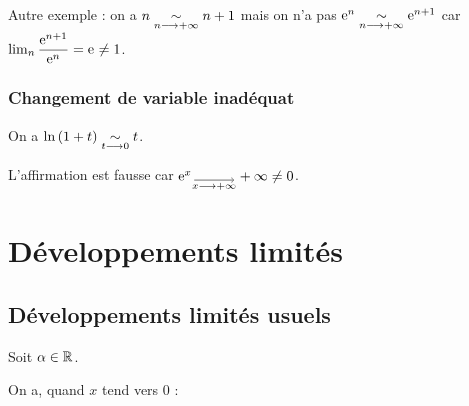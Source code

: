 Autre exemple : on a \(n\underset{n\longrightarrow+\infty}{\sim}n+1\) mais on n'a pas \(\mathrm{e}^{n}\underset{n\longrightarrow+\infty}{\sim}\mathrm{e}^{n+1}\) car \(\lim_n\dfrac{\mathrm{e}^{n+1}}{\mathrm{e}^{n}}=\mathrm{e}^{}\not=1\).

\subsubsection{Changement de variable inadéquat}

On a \(\ln\left(1+t\right)\underset{t\longrightarrow0}{\sim}t\).

L'affirmation  est fausse car \(\e{x}\tendqd{x\to\pinf}\pinf\not=0\).

\section{Développements limités}

\subsection*{Développements limités usuels}\label{subsec:développementsLimitésUsuels}

Soit \(\alpha\in\mathbb{R}\).

On a, quand \(x\) tend vers \(0\) :

